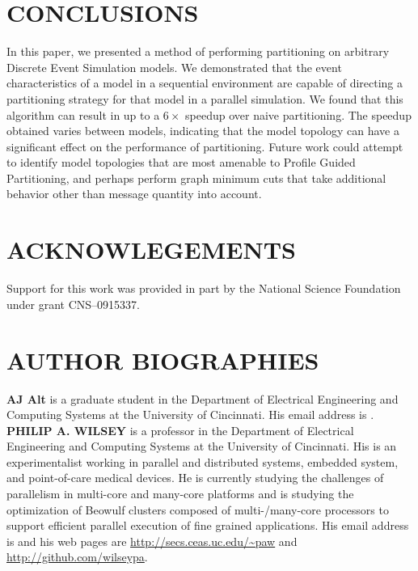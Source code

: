 \documentclass{wscpaperproc}
\begin{document}
\section{CONCLUSIONS}\label{sec:conclusions}

In this paper, we presented a method of performing partitioning on arbitrary Discrete Event Simulation models. We demonstrated that the event characteristics of a model in a sequential environment are capable of directing a partitioning strategy for that model in a parallel simulation. We found that this algorithm can result in up to a \(6\times\) speedup over naive partitioning. The speedup obtained varies between models, indicating that the model topology can have a significant effect on the performance of partitioning. Future work could attempt to identify model topologies that are most amenable to Profile Guided Partitioning, and perhaps perform graph minimum cuts that take additional behavior other than message quantity into account. 

\section*{ACKNOWLEGEMENTS}

Support for this work was provided in part by the National Science Foundation
under grant CNS--0915337.




\section*{AUTHOR BIOGRAPHIES}

\noindent \textbf{AJ Alt} is a graduate student in the Department of Electrical Engineering and Computing Systems at the University of Cincinnati. His email address is .\\

\noindent \textbf{PHILIP A. WILSEY} is a professor in the Department of Electrical Engineering and Computing Systems at the University of Cincinnati. His is an experimentalist working in parallel and distributed systems, embedded system, and point-of-care medical devices. He is currently studying the challenges of parallelism in multi-core and many-core platforms and is studying the optimization of Beowulf clusters composed of multi-/many-core processors to support efficient parallel execution of fine grained applications. His email address is  and his web pages are \url{http://secs.ceas.uc.edu/~paw} and \url{http://github.com/wilseypa}.
\end{document}
